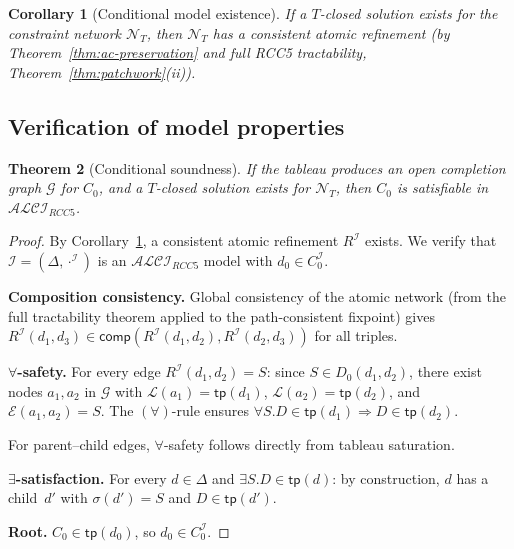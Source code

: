 \documentclass[a4paper,11pt]{article}
\newtheorem{theorem}{Theorem}[section]
\newtheorem{corollary}[theorem]{Corollary}
\theoremstyle{definition}
\newcommand{\ALCIRCC}[1]{\ensuremath{\mathcal{ALCI}_{\mathit{RCC#1}}}}
\newcommand{\interp}{\ensuremath{\mathcal{I}}}
\newcommand{\comp}{\ensuremath{\mathsf{comp}}}
\begin{document}
\begin{corollary}[Conditional model existence]
\label{cor:conditional-model}
If a $T$-closed solution exists for the constraint network
$\mathcal{N}_T$, then $\mathcal{N}_T$ has a consistent atomic
refinement \textup{(}by Theorem~\ref{thm:ac-preservation} and
full RCC5 tractability, Theorem~\ref{thm:patchwork}(ii)\textup{)}.
\end{corollary}


\subsection{Verification of model properties}

\begin{theorem}[Conditional soundness]
\label{thm:soundness}
If the tableau produces an open completion graph $\mathcal{G}$ for
$C_0$, and a $T$-closed solution exists for $\mathcal{N}_T$, then
$C_0$ is satisfiable in $\ALCIRCC{5}$.
\end{theorem}

\begin{proof}
By Corollary~\ref{cor:conditional-model}, a consistent atomic
refinement $R^{\interp}$ exists.  We verify that $\interp = (\Delta,
\cdot^{\interp})$ is an $\ALCIRCC{5}$ model with $d_0 \in
C_0^{\interp}$.

\medskip
\noindent\textbf{Composition consistency.}\;
Global consistency of the atomic network (from the full tractability
theorem applied to the path-consistent fixpoint) gives
$R^{\interp}(d_1, d_3) \in \comp(R^{\interp}(d_1, d_2),
R^{\interp}(d_2, d_3))$ for all triples.

\medskip
\noindent\textbf{$\forall$-safety.}\;
For every edge $R^{\interp}(d_1, d_2) = S$: since
$S \in D_0(d_1, d_2)$, there exist nodes $a_1, a_2$ in $\mathcal{G}$
with $\mathcal{L}(a_1) = \mathsf{tp}(d_1)$,
$\mathcal{L}(a_2) = \mathsf{tp}(d_2)$, and
$\mathcal{E}(a_1, a_2) = S$.  The $(\forall)$-rule ensures
$\forall S.D \in \mathsf{tp}(d_1) \Rightarrow D \in \mathsf{tp}(d_2)$.

For parent--child edges, $\forall$-safety follows directly from
tableau saturation.

\medskip
\noindent\textbf{$\exists$-satisfaction.}\;
For every $d \in \Delta$ and $\exists S.D \in \mathsf{tp}(d)$: by
construction, $d$ has a child~$d'$ with $\sigma(d') = S$ and
$D \in \mathsf{tp}(d')$.

\medskip
\noindent\textbf{Root.}\;
$C_0 \in \mathsf{tp}(d_0)$, so $d_0 \in C_0^{\interp}$.
\end{proof}
\end{document}
